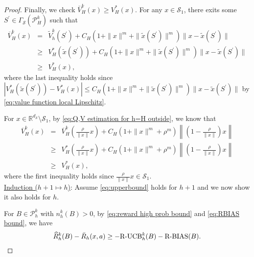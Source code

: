 \documentclass[10pt,a4paper]{amsart}
\begin{document}
\begin{proof}
Finally, we check $\bar V^k_H(x)\ge V_{H}^*(x)$.  For any $x \in \mathcal{S}_1$, there exits  some $S^{\prime}\in \Gamma_{\mathcal{S}}(\mathcal{P}_H^k)$ such that
   \begin{eqnarray*}
           \overline{V}_{H}^{k}(x)&=&\widetilde{V}_{h}^{k}(S^{\prime})+C_{H}(1+\|x\|^m+\|\tilde{x}(S^{\prime})\|^m)\|x-\tilde{x}(S^{\prime})\|\\
           &\geq& V_{H}^{*}(\tilde{x}(S^{\prime}))+C_{H}(1+\|x\|^m+\|\tilde{x}(S^{\prime})\|^m)\|x-\tilde{x}(S^{\prime})\|\\
           &\geq& V_{H}^{*}(x),
   \end{eqnarray*}
where the last inequality holds since $|V_{H}^{*}(\tilde{x}(S^{\prime}))-V_{H}^{*}(x)|\leq C_{H}(1+\|x\|^m+\|\tilde{x}(S^{\prime})\|^m)\|x-\tilde{x}(S^{\prime})\|$ by \eqref{eq:value function local Lipschitz}.

For $x\in \mathbb{R}^{d_{\mathcal{S}}}\setminus \mathcal{S}_{1}$, by \eqref{eq:Q,V estimation for h=H outside}, we know that 
\begin{eqnarray*}
        \overline{V}_{H}^{k}(x)&=&\overline{V}_{H}^{k}\left(\frac{\rho}{\|x\|}x
        \right)+C_{H}(1+\|x\|^{m}+\rho^{m})\left\|\left(1-\frac{\rho}{\|x\|}\right)x\right\|\\
        &\geq& V_{H}^{*}(\frac{\rho}{\|x\|}x)+C_{H}(1+\|x\|^{m}+\rho^{m})\left\|(1-\frac{\rho}{\|x\|})x\right\|\\
        &\geq& V_{H}^{*}(x),
\end{eqnarray*}
where the first inequality holds since $\frac{\rho}{\|x\|}x\in \mathcal{S}_{1}$.\\

\noindent \underline{Induction ($h+1 \mapsto h$)}: 
Assume \eqref{eq:upperbound} holds for $h+1$ and we now show it also holds for $h$.



 
For $B\in \mathcal{P}_h^k$ with $n_h^k(B)>0$, by \eqref{eq:reward high prob bound} and \eqref{eq:RBIAS bound}, we have 
\begin{eqnarray}\label{eq:RUCB lower bound} 
          \widehat{R}_h^k(B)-\bar{R}_{h}(x,a) \geq -\mbox{\rm R-UCB}_h^k(B)-\mbox{\rm R-BIAS}(B). 
    \end{eqnarray}


\end{proof}
\end{document}
